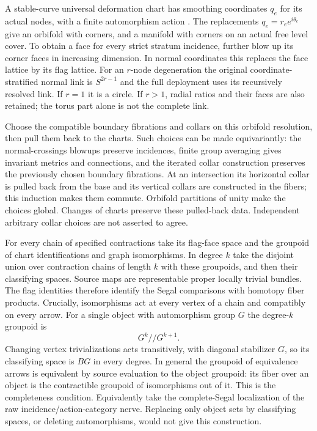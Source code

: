 \documentclass[11pt,a4paper]{article}
\theoremstyle{definition}
\begin{document}
A stable-curve universal deformation chart has smoothing coordinates
$q_e$ for its actual nodes, with a finite automorphism action
\cite[Theorems~8.11, 9.13; Proposition~9.16]{Looijenga}.
The replacements $q_e=r_e e^{i\theta_e}$ give an orbifold with corners,
and a manifold with corners on an actual free level cover. To obtain
a face for every strict stratum incidence, further blow up its corner
faces in increasing dimension. In normal coordinates this replaces
the face lattice by its flag lattice. For an $r$-node degeneration
the original coordinate-stratified normal link is $S^{2r-1}$ and the
full deployment uses its recursively resolved link. If $r=1$ it is a
circle. If $r>1$, radial ratios and their faces are also retained;
the torus part alone is not the complete link.

Choose the compatible boundary fibrations and collars on this orbifold
resolution, then pull them back to the charts. Such choices can be made
equivariantly: the normal-crossings blowups preserve incidences, finite
group averaging gives invariant metrics and connections, and the
iterated collar construction preserves the previously chosen boundary
fibrations. At an intersection its horizontal collar is pulled back
from the base and its vertical collars are constructed in the fibers;
this induction makes them commute. Orbifold partitions of unity make
the choices global. Changes of charts preserve these pulled-back data.
Independent arbitrary collar choices are not asserted to agree.

For every chain of specified contractions take its flag-face space and
the groupoid of chart identifications and graph isomorphisms. In degree
$k$ take the disjoint union over contraction chains of length $k$ with
these groupoids, and then their classifying spaces. Source maps are
representable proper locally trivial bundles. The flag identities
therefore identify the Segal comparisons with homotopy fiber products.
Crucially, isomorphisms act at every vertex of a chain and compatibly
on every arrow. For a single object with automorphism group $G$ the
degree-$k$ groupoid is
\[
 G^k\mathbin{//}G^{k+1}.
\]
Changing vertex trivializations acts transitively, with diagonal
stabilizer $G$, so its classifying space is $BG$ in every degree.
In general the groupoid of equivalence arrows is equivalent by source
evaluation to the object groupoid: its fiber over an object is the
contractible groupoid of isomorphisms out of it. This is the completeness
condition. Equivalently take the complete-Segal localization of the raw
incidence/action-category nerve. Replacing only object sets by
classifying spaces, or deleting automorphisms, would not give this
construction.
\end{document}
